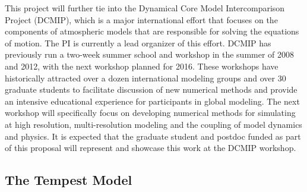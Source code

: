 \documentclass[11pt]{article}
\begin{document}
This project will further tie into the Dynamical Core Model Intercomparison Project (DCMIP), which is a major international effort that focuses on the components of atmospheric models that are responsible for solving the equations of motion.  The PI is currently a lead organizer of this effort.  DCMIP has previously run a two-week summer school and workshop in the summer of 2008 and 2012, with the next workshop planned for 2016.  These workshops have historically attracted over a dozen international modeling groups and over 30 graduate students to facilitate discussion of new numerical methods and provide an intensive educational experience for participants in global modeling.  The next workshop will specifically focus on developing numerical methods for simulating at high resolution, multi-resolution modeling and the coupling of model dynamics and physics.  It is expected that the graduate student and postdoc funded as part of this proposal will represent and showcase this work at the DCMIP workshop.



\subsection{The Tempest Model} \label{sec:TempestModel}
\end{document}
